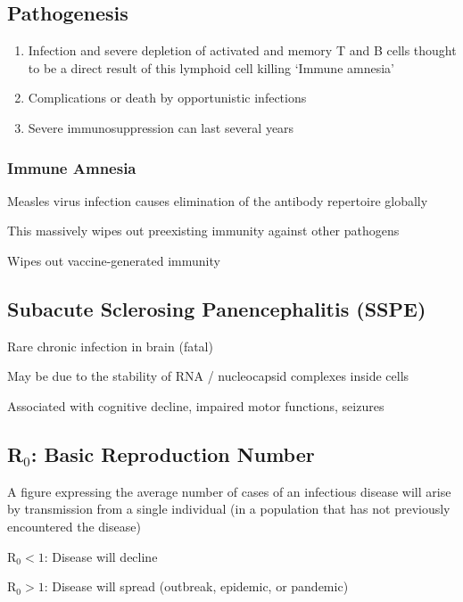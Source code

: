 \documentclass{notes}
\begin{document}
\subsection{Pathogenesis}

\begin{enumerate}
    \item Infection and severe depletion of activated and memory T and B cells
    \subitem {} thought to be a direct result of this lymphoid cell killing
    \subitem `Immune amnesia'
    \item Complications or death by opportunistic infections
    \item Severe immunosuppression can last several years
\end{enumerate}

\subsubsection{Immune Amnesia}

Measles virus infection causes elimination of the antibody repertoire globally

This massively wipes out preexisting immunity against other pathogens

\tab \indicates Wipes out vaccine-generated immunity

\subsection{Subacute Sclerosing Panencephalitis (SSPE)}

Rare chronic infection in brain (fatal)

\tab May be due to the stability of RNA / nucleocapsid complexes inside cells

Associated with cognitive decline, impaired motor functions, seizures

\subsection{\texorpdfstring{R\(_0\): Basic Reproduction Number}{R0: Basic Reproduction Number}}

A figure expressing the average number of cases of an infectious disease will arise by transmission from a single individual (in a population that has not previously encountered the disease)

R\(_0 < 1\): Disease will decline

R\(_0 > 1\): Disease will spread (outbreak, epidemic, or pandemic)
\end{document}

